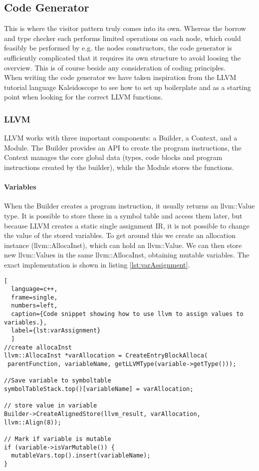 \subsection{Code Generator}
\label{sec:CodeGenImplement}
This is where the visitor pattern truly comes into its own. Whereas the borrow and type checker each performs limited operations on each node, which could feasibly be performed by e.g. the nodes constructors, the code generator is sufficiently complicated that it requires its own structure to avoid loosing the overview. This is of course beside any consideration of coding principles.\\
When writing the code generator we have taken inspiration from the LLVM tutorial
language Kaleidoscope\cite{LLVMTutorial} to see how to set up boilerplate and as a
starting point when looking for the correct LLVM functions.

\subsubsection{LLVM}
LLVM works with three important components: a Builder, a Context, and a Module. The Builder provides an API to create the program instructions, the Context manages the core global data (types, code blocks and program instructions created by the builder), while the Module stores the functions.

\paragraph*{Variables}
When the Builder creates a program instruction, it usually returns an llvm::Value type. It is possible to store these in a symbol table and access them later, but because LLVM creates a static single assignment IR, it is not possible to change the value of the stored variables. To get around this we create an allocation instance (llvm::AllocaInst), which can hold an llvm::Value. We can then store new llvm::Values in the same llvm::AllocaInst, obtaining mutable variables. The exact implementation is shown in listing \ref{lst:varAssignment}.

\begin{lstlisting}[
  language=c++,
  frame=single,
  numbers=left,
  caption={Code snippet showing how to use llvm to assign values to variables.},
  label={lst:varAssignment}
  ]
//create allocaInst
llvm::AllocaInst *varAllocation = CreateEntryBlockAlloca(
 parentFunction, variableName, getLLVMType(variable->getType()));
  	
//Save variable to symboltable
symbolTableStack.top()[variableName] = varAllocation;

// store value in variable
Builder->CreateAlignedStore(llvm_result, varAllocation, llvm::Align(8));

// Mark if variable is mutable
if (variable->isVarMutable()) {
  mutableVars.top().insert(variableName);
}
\end{lstlisting}

